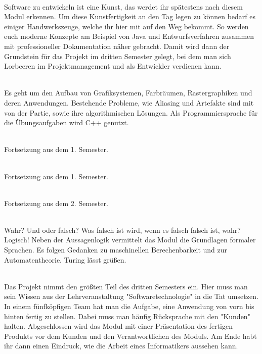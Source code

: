 \textbf{} \\
Software zu entwickeln ist eine Kunst, das werdet ihr spätestens nach diesem Modul erkennen.
Um diese Kunstfertigkeit an den Tag legen zu können bedarf es einiger Handwerkszeuge, welche ihr hier mit auf den Weg bekommt.
So werden euch moderne Konzepte am Beispiel von Java und Entwurfsverfahren zusammen mit professioneller Dokumentation näher gebracht.
Damit wird dann der Grundstein für das Projekt im dritten Semester gelegt, bei dem man sich Lorbeeren im Projektmanagement und als Entwickler verdienen kann.

\textbf{} \\
Es geht um den Aufbau von Grafiksystemen, Farbräumen, Rastergraphiken und deren Anwendungen.
Bestehende Probleme, wie Aliasing und Artefakte sind mit von der Partie, sowie ihre algorithmischen Lösungen.
Als Programmiersprache für die Übungsaufgaben wird C++ genutzt.

\textbf{} \\
Fortsetzung aus dem 1. Semester.

\textbf{} \\
Fortsetzung aus dem 1. Semester.


\textbf{} \\
Fortsetzung aus dem 2. Semester.

\textbf{} \\
Wahr?
Und oder falsch?
Was falsch ist wird, wenn es falsch falsch ist, wahr?
Logisch!
Neben der Aussagenlogik vermittelt das Modul die Grundlagen formaler Sprachen.
Es folgen Gedanken zu maschinellen Berechenbarkeit und zur Automatentheorie.
Turing lässt grüßen.

\textbf{} \\
Das Projekt nimmt den größten Teil des dritten Semesters ein.
Hier muss man sein Wissen aus der Lehrveranstaltung "Softwaretechnologie" in die Tat umsetzen.
In einem fünfköpfigen Team hat man die Aufgabe, eine Anwendung von vorn bis hinten fertig zu stellen.
Dabei muss man häufig Rücksprache mit den "Kunden" halten.
Abgeschlossen wird das Modul mit einer Präsentation des fertigen Produkts vor dem Kunden und den Verantwortlichen des Moduls.
Am Ende habt ihr dann einen Eindruck, wie die Arbeit eines Informatikers aussehen kann.

